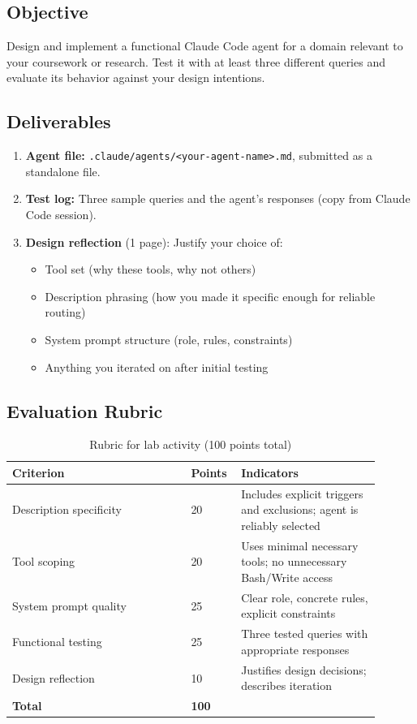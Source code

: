 \documentclass[11pt,letterpaper]{article}
\begin{document}
\subsection{Objective}

Design and implement a functional Claude Code agent for a domain relevant to your coursework or research. Test it with at least three different queries and evaluate its behavior against your design intentions.

\subsection{Deliverables}

\begin{enumerate}[leftmargin=*]
    \item \textbf{Agent file:} \texttt{.claude/agents/<your-agent-name>.md}, submitted as a standalone file.
    \item \textbf{Test log:} Three sample queries and the agent's responses (copy from Claude Code session).
    \item \textbf{Design reflection} (1 page): Justify your choice of:
        \begin{itemize}
            \item Tool set (why these tools, why not others)
            \item Description phrasing (how you made it specific enough for reliable routing)
            \item System prompt structure (role, rules, constraints)
            \item Anything you iterated on after initial testing
        \end{itemize}
\end{enumerate}

\subsection{Evaluation Rubric}

\begin{table}[H]
\centering
\caption{Rubric for lab activity (100 points total)}
\begin{tabular}{@{}p{0.45\linewidth}p{0.1\linewidth}p{0.35\linewidth}@{}}
\toprule
\textbf{Criterion} & \textbf{Points} & \textbf{Indicators} \\
\midrule
Description specificity & 20 & Includes explicit triggers and exclusions; agent is reliably selected \\
Tool scoping & 20 & Uses minimal necessary tools; no unnecessary Bash/Write access \\
System prompt quality & 25 & Clear role, concrete rules, explicit constraints \\
Functional testing & 25 & Three tested queries with appropriate responses \\
Design reflection & 10 & Justifies design decisions; describes iteration \\
\midrule
\textbf{Total} & \textbf{100} & \\
\bottomrule
\end{tabular}
\end{table}
\end{document}
